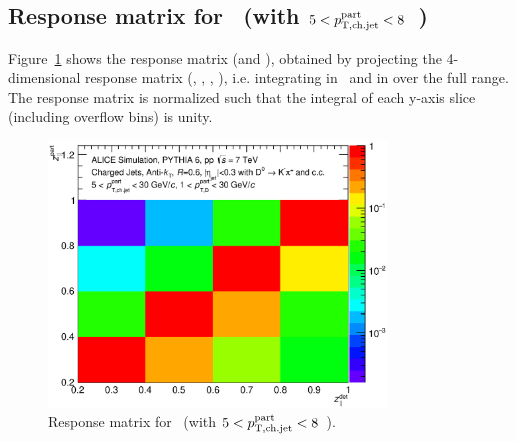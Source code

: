 \subsection{Response matrix for \zpar\ (with $5<p_{\mathrm{T,ch.jet}}^{\mathrm{part}}<8$~\GeVc)}
Figure~\ref{fig:D0_Full_R060_ResponseMatrix_Z_JetPt_5_30_DPt_01_30_Norm} shows the response matrix (\zpargen and \zpardet), obtained by
projecting the 4-dimensional response matrix (\zpargen, \ptchjetgen, \zpardet, \ptchjetdet), i.e. integrating in \ptchjetgen\ and in  \ptchjetdet over the
full range.
The response matrix is normalized such that the integral of each y-axis slice (including overflow bins) is unity.
\begin{figure}[tbh]
\begin{center}
\includegraphics[width=0.8\textwidth]{img/D0_Full_R060_ResponseMatrix_Z_JetPt_5_30_DPt_01_30_Norm}
 \caption{Response matrix for \zpar\ (with $5<p_{\mathrm{T,ch.jet}}^{\mathrm{part}}<8$~\GeVc).} 
 \label{fig:D0_Full_R060_ResponseMatrix_Z_JetPt_5_30_DPt_01_30_Norm}
\end{center}
\end{figure}
